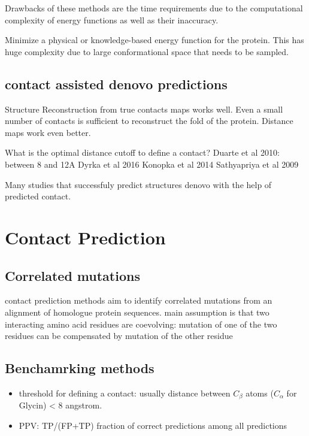 \documentclass[12pt,a4paper,twoside]{book}
\theoremstyle{definition}
\theoremstyle{definition}
\theoremstyle{remark}
\begin{document}
Drawbacks of these methods are the time requirements due to the
computational complexity of energy functions as well as their
inaccuracy.

Minimize a physical or knowledge-based energy function for the protein.
This has huge complexity due to large conformational space that needs to
be sampled.

\subsection{contact assisted denovo
predictions}\label{contact-assisted-denovo-predictions}

Structure Reconstruction from true contacts maps works well. Even a
small number of contacts is sufficient to reconstruct the fold of the
protein. Distance maps work even better.

What is the optimal distance cutoff to define a contact? Duarte et al
2010: between 8 and 12A Dyrka et al 2016 Konopka et al 2014 Sathyapriya
et al 2009

Many studies that successfuly predict structures denovo with the help of
predicted contact.

\section{Contact Prediction}\label{contact-prediction}

\subsection{Correlated mutations}\label{correlated-mutations}

contact prediction methods aim to identify correlated mutations from an
alignment of homologue protein sequences. main assumption is that two
interacting amino acid residues are coevolving: mutation of one of the
two residues can be compensated by mutation of the other residue

\subsection{Benchamrking methods}\label{benchamrking-methods}

\begin{itemize}
\item
  threshold for defining a contact: usually distance between \(C_\beta\)
  atoms (\(C_\alpha\) for Glycin) \textless{} 8 angstrom.
\item
  PPV: TP/(FP+TP) fraction of correct predictions among all predictions
\end{itemize}
\end{document}

